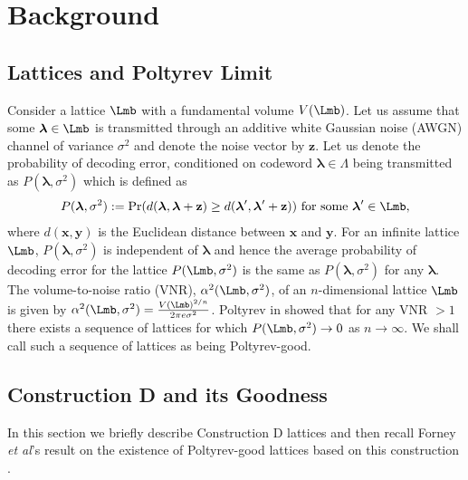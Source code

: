 \documentclass[conference]{IEEEtran}
\begin{document}
\section{Background}
\label{Section:Background}
\subsection{Lattices and Poltyrev Limit}
Consider a lattice $\Lmb$ with a fundamental volume $V(\Lmb)$. Let us assume that some $\mathbf{\boldsymbol\lambda}\in\Lmb$ is transmitted through an additive white Gaussian noise (AWGN) channel of variance $\sigma^{2}$ and denote the noise
vector by $\mathbf{z}$. Let us denote the probability of decoding error, conditioned on codeword $\boldsymbol\lambda 	\in\Lambda$ being
transmitted as $P(\mathbf{\boldsymbol\lambda},\sigma^{2})$ which is defined as
\begin{align*}
 P(\boldsymbol\lambda,\sigma^{2}):=\Pr(d(\boldsymbol\lambda,\boldsymbol\lambda+\mathbf{z})\geq d(\boldsymbol\lambda',\boldsymbol\lambda'+\mathbf{z})) \text{ for some } \boldsymbol\lambda' \in\Lmb,
\end{align*}
where $d(\mathbf{x},\mathbf{y})$ is the Euclidean distance between $\mathbf{x}$ and $\mathbf{y}$. For an infinite lattice $\Lmb$, $P(\boldsymbol\lambda,\sigma^{2})$ is independent of $\boldsymbol\lambda$ and hence the average probability of decoding error for the lattice  $P(\Lmb,\sigma^{2})$ is the same as $P(\boldsymbol\lambda,\sigma^{2})$ for any $\boldsymbol\lambda$.
The volume-to-noise ratio (VNR), $\alpha^{2}(\Lmb,\sigma^{2})$,
of an $n$-dimensional lattice $\Lmb$ is given by $\alpha^{2}(\Lmb,\sigma^{2})=\frac{V(\Lmb)^{2/n}}{2\pi e\sigma^{2}}$.
Poltyrev in \cite{poltyrev94} showed that for any VNR $>1$ there exists a sequence of lattices for which $P(\Lmb,\sigma^{2}) \rightarrow 0$ as $n \rightarrow \infty$. We shall call such a sequence of lattices as being Poltyrev-good.

\subsection{Construction D and its Goodness}
In this section we briefly describe Construction D lattices \cite{BarnesSloane83} \cite{conway1999sphere} and then recall Forney {\em et al}'s result on the existence of Poltyrev-good lattices based on this construction \cite{forney2000}.
\end{document}
